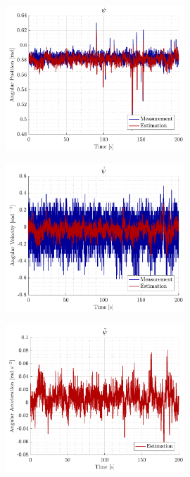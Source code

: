 \begin{figure}[H]
    \includegraphics[width=0.6\textwidth]{figures/real_yaw}
    \caption{}
    \label{fig:real_yaw}
\end{figure}

\begin{figure}[H]
    \includegraphics[width=0.6\textwidth]{figures/real_yawdot}
    \caption{}
    \label{fig:real_yawdot}
\end{figure}

\begin{figure}[H]
    \includegraphics[width=0.6\textwidth]{figures/real_yawddot}
    \caption{}
    \label{fig:real_yawddot}
\end{figure}